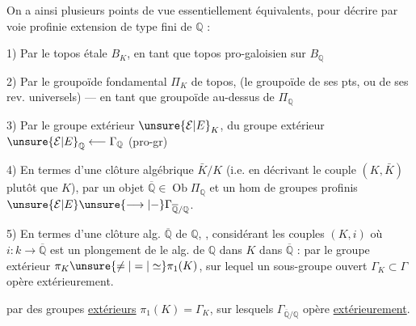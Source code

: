 On a ainsi plusieurs points de vue essentiellement équivalents, pour décrire par voie profinie  extension  de type fini de $\mathbb Q$ :

1) Par le topos étale $B_K$, en tant que topos pro-galoisien sur $B_{\mathbb Q}$

2) Par le groupoïde fondamental $\Pi_K$ de  topos, (le groupoïde de ses pts, ou de ses rev. universels) --- en tant que groupoïde au-dessus de $\Pi_{\mathbb Q}$

 3) Par le groupe extérieur $\unsure{\mathcal E|E}_K$,  du groupe extérieur $\unsure{\mathcal E|E}_{\mathbb Q}\longleftarrow\Gamma_{\mathbb Q}$ (pro-gr)

4) En termes d'une clôture algébrique $\bar K/K$ (i.e. en décrivant le couple $(K,\bar K)$ plutôt que $K$), par un objet $\overline{\mathbb Q}\in\operatorname{Ob}\Pi_{\mathbb Q}$\unsure{,|)} et un hom de groupes profinis $\unsure{\mathcal E|E}\unsure{\longrightarrow|-}\Gamma_{\overline{\mathbb Q}/\mathbb Q}$.

5) En termes d'une clôture alg.  $\overline{\mathbb Q}$ de $\mathbb Q$, ,  considérant les couples $(K,i)$ où $i:k\longrightarrow\overline{\mathbb Q}$ est un plongement de le  alg. de $\mathbb Q$ dans $K$ dans $\overline{\mathbb Q}$ :  par le groupe extérieur $\pi_K\unsure{\neq|=|\simeq}\pi_1(K)$, sur lequel un sous-groupe ouvert $\Gamma_K\subset\Gamma$ opère extérieurement.


par des groupes  \uline{extérieurs} $\pi_1(K)=\Gamma_K$, sur lesquels  $\Gamma_{\overline{\mathbb Q}/\mathbb Q}$ opère \uline{extérieurement}.

